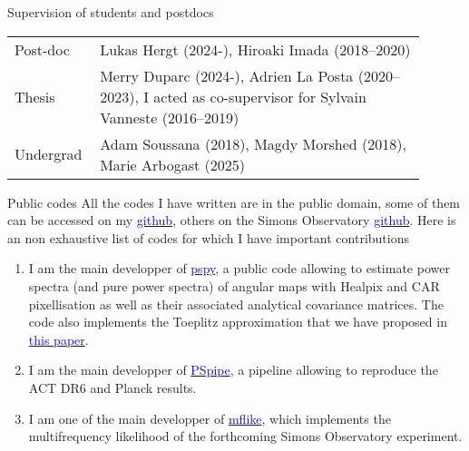 \documentclass{resume} %
\newcommand{\TIB}[1]{\textcolor{blue}{#1}}
\begin{document}
\vspace{-0.6cm}

\begin{rSection}{Supervision of	students and postdocs}
\vspace{-0.4cm}

\begin{table}[h]
{\def\arraystretch{1.5}\tabcolsep=0pt
\begin{tabular}{p{0.15\linewidth}p{0.75\linewidth}}
Post-doc  & Lukas Hergt (2024-), Hiroaki Imada (2018--2020) \\
Thesis  & Merry Duparc (2024-),  Adrien La Posta (2020--2023), I acted as co-supervisor for Sylvain Vanneste (2016--2019) \\
Undergrad   & Adam Soussana (2018), Magdy Morshed (2018), Marie Arbogast (2025)
\end{tabular}%
}
\end{table}
\end{rSection}

\vspace{-0.6cm}

\begin{rSection}{Public codes}
All the codes I have written are in the public domain, some of them can be accessed on my \href{https://github.com/thibautlouis}{\TIB{github}}, others on the Simons Observatory \href{https://github.com/simonobs}{\TIB{github}}. Here is an non exhaustive list of codes for which I have important contributions 
\begin{enumerate}
\item I am the main developper of \href{https://github.com/simonsobs/pspy}{\TIB{pspy}}, a public code allowing to estimate power spectra (and pure power spectra) of angular maps with Healpix and CAR pixellisation as well as their associated analytical covariance matrices. The code also implements the Toeplitz approximation that we have proposed in \href{https://ui.adsabs.harvard.edu/abs/2020PhRvD.102l3538L/abstract}{\TIB{this paper}}.
\item I am  the main developper of \href{https://github.com/simonsobs/PSpipe}{\TIB{PSpipe}}, a pipeline  allowing to reproduce the ACT DR6 and Planck results. 
\item I am one of the main developper of \href{https://github.com/simonsobs/mflike}{\TIB{mflike}}, which implements the multifrequency likelihood of the forthcoming Simons Observatory experiment. 

\end{enumerate}

\end{rSection}
\end{document}
